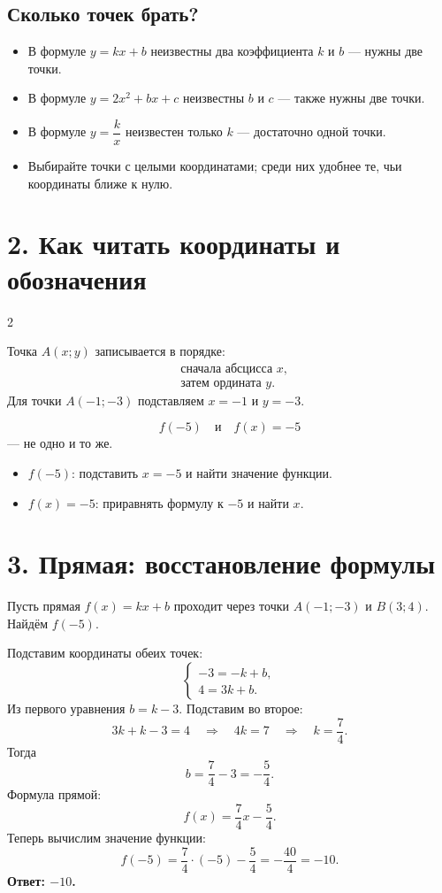 \documentclass[a4paper,12pt]{article}
\begin{document}
\subsection*{Сколько точек брать?}
\begin{itemize}
\item В формуле $y=kx+b$ неизвестны два коэффициента $k$ и $b$ --- нужны две точки.
\item В формуле $y=2x^2+bx+c$ неизвестны $b$ и $c$ --- также нужны две точки.
\item В формуле $y=\dfrac{k}{x}$ неизвестен только $k$ --- достаточно одной точки.
\item Выбирайте точки с целыми координатами; среди них удобнее те, чьи координаты ближе к нулю.
\end{itemize}

\section*{2. Как читать координаты и обозначения}
\begin{multicols}{2}
\begin{keybox}
Точка $A(x;y)$ записывается в порядке:
\[
\begin{aligned}
&\text{сначала абсцисса }x,\\
&\text{затем ордината }y.
\end{aligned}
\]
Для точки $A(-1;-3)$ подставляем $x=-1$ и $y=-3$.
\end{keybox}

\begin{keybox}
\[
f(-5)\quad\text{и}\quad f(x)=-5
\]
--- не одно и то же.
\begin{itemize}
\item $f(-5)$: подставить $x=-5$ и найти значение функции.
\item $f(x)=-5$: приравнять формулу к $-5$ и найти $x$.
\end{itemize}
\end{keybox}
\end{multicols}

\section*{3. Прямая: восстановление формулы}
\begin{examplebox}
Пусть прямая $f(x)=kx+b$ проходит через точки $A(-1;-3)$ и $B(3;4)$. Найдём $f(-5)$.

Подставим координаты обеих точек:
\[
\begin{cases}
-3=-k+b,\\
4=3k+b.
\end{cases}
\]
Из первого уравнения $b=k-3$. Подставим во второе:
\[
3k+k-3=4 \quad\Longrightarrow\quad 4k=7 \quad\Longrightarrow\quad k=\frac74.
\]
Тогда
\[
b=\frac74-3=-\frac54.
\]
Формула прямой:
\[
f(x)=\frac74x-\frac54.
\]
Теперь вычислим значение функции:
\[
f(-5)=\frac74\cdot(-5)-\frac54=-\frac{40}{4}=-10.
\]
\textbf{Ответ: $-10$.}
\end{examplebox}
\end{document}
